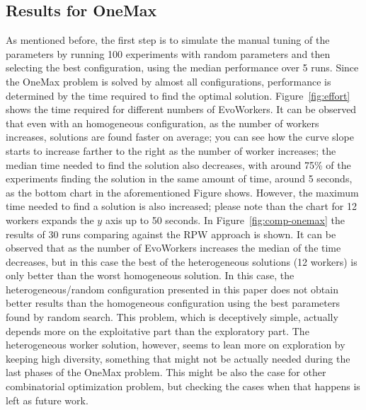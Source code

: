 \documentclass[conference]{IEEEtran}
\begin{document}
\subsection{Results for OneMax}

As mentioned before, the first step is to simulate the manual tuning of the parameters
by running 100 experiments with random parameters and then selecting the best configuration,
using the median performance over 5 runs. Since the OneMax problem is solved by almost all
configurations, performance is determined by the time required to find the optimal solution.
Figure~\ref{fig:effort} shows the time required for different numbers of EvoWorkers.
It can be observed that even with an homogeneous configuration, as the number of workers
increases, solutions are found faster on average; you can see how the
curve slope starts to increase farther to the right as the number of
worker increases; the median time needed to find the solution also decreases,
with around 75\% of the experiments finding the solution in the same
amount of time, around 5 seconds, as the bottom chart in the
aforementioned Figure shows. However, the maximum time needed to find
a solution is also increased; please note than the chart for 12
workers expands the $y$ axis up to 50 seconds.
In Figure~\ref{fig:comp-onemax} the results of 30 runs comparing against the RPW approach is shown.
It can be observed that as the number of EvoWorkers increases the median of the time decreases, but
in this case the best of the heterogeneous solutions (12 workers) is only better than the worst homogeneous
solution. In this case, the heterogeneous/random configuration
presented in this paper does not obtain better results than the
homogeneous configuration using the best parameters found by random
search. This problem, which is deceptively simple, actually depends
more on the exploitative part than the exploratory part. The
heterogeneous worker solution, however, seems to lean more on
exploration by keeping high diversity, something that might not be
actually needed during the last phases of the OneMax problem. This
might be also the case for other combinatorial optimization problem,
but checking the cases when that happens is left as future work.
\end{document}
